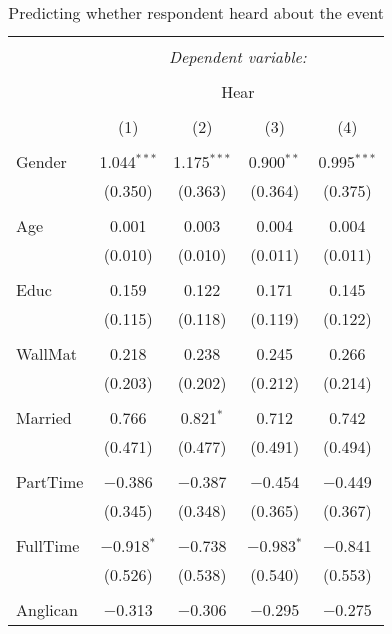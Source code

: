 
\begin{table}[H] \centering 
  \caption{Predicting whether respondent heard about the event} 
  \label{} 
\footnotesize 
\begin{tabular}{@{\extracolsep{5pt}}lcccc} 
\\[-1.8ex]\hline 
\hline \\[-1.8ex] 
 & \multicolumn{4}{c}{\textit{Dependent variable:}} \\ 
\cline{2-5} 
\\[-1.8ex] & \multicolumn{4}{c}{Hear} \\ 
\\[-1.8ex] & (1) & (2) & (3) & (4)\\ 
\hline \\[-1.8ex] 
 Gender & 1.044$^{***}$ & 1.175$^{***}$ & 0.900$^{**}$ & 0.995$^{***}$ \\ 
  & (0.350) & (0.363) & (0.364) & (0.375) \\ 
  & & & & \\ 
 Age & 0.001 & 0.003 & 0.004 & 0.004 \\ 
  & (0.010) & (0.010) & (0.011) & (0.011) \\ 
  & & & & \\ 
 Educ & 0.159 & 0.122 & 0.171 & 0.145 \\ 
  & (0.115) & (0.118) & (0.119) & (0.122) \\ 
  & & & & \\ 
 WallMat & 0.218 & 0.238 & 0.245 & 0.266 \\ 
  & (0.203) & (0.202) & (0.212) & (0.214) \\ 
  & & & & \\ 
 Married & 0.766 & 0.821$^{*}$ & 0.712 & 0.742 \\ 
  & (0.471) & (0.477) & (0.491) & (0.494) \\ 
  & & & & \\ 
 PartTime & $-$0.386 & $-$0.387 & $-$0.454 & $-$0.449 \\ 
  & (0.345) & (0.348) & (0.365) & (0.367) \\ 
  & & & & \\ 
 FullTime & $-$0.918$^{*}$ & $-$0.738 & $-$0.983$^{*}$ & $-$0.841 \\ 
  & (0.526) & (0.538) & (0.540) & (0.553) \\ 
  & & & & \\ 
 Anglican & $-$0.313 & $-$0.306 & $-$0.295 & $-$0.275 \\ 

\end{tabular}
\end{table}
